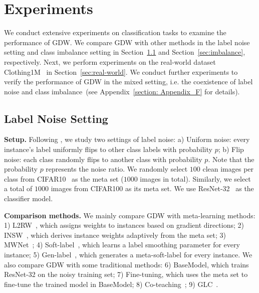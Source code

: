 \section{Experiments}
%
We conduct extensive experiments on classification tasks to examine the performance of GDW.
%
We compare GDW with other methods in the label noise setting and class imbalance setting in Section~\ref{sec:noise} and Section~\ref{sec:imbalance}, respectively.
%
Next, we perform experiments on the real-world dataset Clothing1M~\cite{tongxiaoLearningMassiveNoisy2015} in Section~\ref{sec:real-world}.
%
We conduct further experiments to verify the performance of GDW in the mixed setting, i.e. the coexistence of label noise and class imbalance~(see Appendix~\ref{section: Appendix_F} for details).

\subsection{Label Noise Setting}
\label{sec:noise}
%
\noindent \textbf{Setup.} Following \cite{shuMetaWeightNetLearningExplicit2019a}, we study two settings of label noise: a) Uniform noise: every instance's label uniformly flips to other class labels with probability $p$; b) Flip noise: each class randomly flips to another class with probability $p$.
%
Note that the probability $p$ represents the noise ratio.
%
We randomly select $100$ clean images per class from CIFAR10~\cite{krizhevskyLearningMultipleLayers2009} as the meta set ($1000$ images in total).
%
Similarly, we select a total of $1000$ images from CIFAR100 as its meta set.
%
We use ResNet-32~\cite{heDeepResidualLearning2016} as the classifier model.

%
\noindent \textbf{Comparison methods.} We mainly compare GDW with meta-learning methods: 1) L2RW~\cite{renLearningReweightExamples2018}, which assigns weights to instances based on gradient directions;
2) INSW~\cite{huLearningDataManipulation2019a}, which derives instance weights adaptively from the meta set;
3) MWNet~\cite{shuMetaWeightNetLearningExplicit2019a}; 4) Soft-label~\cite{vyasLearningSoftLabels2020b}, which learns a label smoothing parameter for every instance; 5) Gen-label~\cite{alganMetaSoftLabel2021a}, which generates a meta-soft-label for every instance.
%
We also compare GDW with some traditional methods: 6) BaseModel, which trains ResNet-32 on the noisy training set; 7) Fine-tuning, which uses the meta set to fine-tune the trained model in BaseModel; 8) Co-teaching~\cite{hanCoteachingRobustTraining2018a}; 9) GLC~\cite{hendrycksUsingTrustedData2018}.
%

